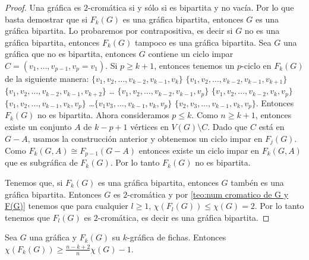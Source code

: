 \begin{proof}
    Una gr\'afica es $2$-crom\'atica si y s\'olo si es bipartita y no vac\'ia.
    Por lo que basta demostrar que si $F_k(G)$ es una gr\'afica bipartita,
    entonces $G$ es una gr\'afica bipartita. Lo probaremos por contrapositiva,
    es decir si $G$ no es una gr\'afica bipartita, entonces $F_k(G)$ tampoco es
    una gr\'afica bipartita. Sea $G$ una gr\'afica que no es bipartita, entonces
    $G$ contiene un ciclo impar $C=(v_1, \dots, v_{p-1}, v_p = v_1)$. Si $p \geq
    k+1$, entonces tenemos un $p$-ciclo en $F_k(G)$ de la siguiente manera:
    $\{v_1, v_2, \dots, v_{k-2}, v_{k-1}, v_k\}$ $\{v_1, v_2, \dots, v_{k-2},
    v_{k-1}, v_{k+1}\}$ $\{v_1, v_2, \dots, v_{k-2}, v_{k-1}, v_{k+2}\}$ \dots
    $\{v_1, v_2, \dots, v_{k-2}, v_{k-1}, v_p\}$ $\{v_1, v_2, \dots, v_{k-2},
    v_k, v_p\}$ $\{v_1, v_2, \dots, v_{k-1}, v_k, v_p\}$ \dots $\{v_1 v_3,
    \dots, v_{k-1}, v_k, v_p\}$ $\{v_2, v_3, \dots, v_{k-1}, v_k, v_p\}$.
    Entonces $F_k(G)$ no es bipartita. Ahora consideramos $p \leq k$. Como $n
    \geq k+1$, entonces existe un conjunto $A$ de $k-p+1$ v\'ertices en
    $V(G)\setminus C$. Dado que $C$ est\'a en $G -A$, usamos la construcci\'on
    anterior y obtenemos un ciclo impar en $F_j(G)$. Como $F_k(G,A) \cong
    F_{p-1}(G-A)$ entonces existe un ciclo impar en $F_k(G,A)$ que es
    subgr\'afica de $F_k(G)$. Por lo tanto $F_k(G)$ no es bipartita.

    Tenemos que, si $F_k(G)$ es una gr\'afica bipartita, entonces $G$ tamb\'en
    es una gr\'afica bipartita. Entonces $G$ es $2$-crom\'atica y por
    \cref{teo:num cromatico de G y F(G)} tenemos que para cualquier $l\geq 1$,
    $\chi (F_l(G)) \le \chi (G)=2$. Por lo tanto tenemos que $F_l(G)$ es
    $2$-crom\'atica, es decir es una gr\'afica bipartita.
\end{proof}

    \begin{teorema}
        \label{relacion num cromatico G y F(G) con k}
            Sea $G$ una gr\'afica y $F_k(G)$ su $k$-gr\'afica de fichas.
            Entonces $\chi(F_k(G)) \geq \frac{n-k+2}{n} \chi(G) -1$.
        \end{teorema}
        
